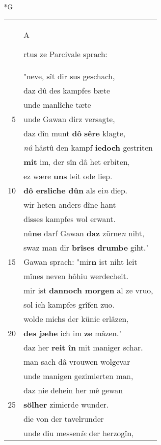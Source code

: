 \documentclass[8pt,a4paper,notitlepage]{article}
\begin{document}
\begin{table}[ht]
\begin{minipage}[t]{0.5\linewidth}
\small
\begin{center}*G
\end{center}
\begin{tabular}{rl}
 & \begin{large}A\end{large}rtus ze Parcivale sprach:\\ 
 & "neve, sît dir sus geschach,\\ 
 & daz dû des kampfes bæte\\ 
 & unde manlîche tæte\\ 
5 & unde Gawan dirz versagte,\\ 
 & daz dîn munt \textbf{dô} \textbf{sêre} klagte,\\ 
 & \textit{nû} hâstû den kampf \textbf{iedoch} gestriten\\ 
 & \textbf{mit} im, der sîn dâ het erbiten,\\ 
 & ez wære \textbf{uns} leit ode liep.\\ 
10 & \textbf{dô ersliche dûn} als ei\textit{n} diep.\\ 
 & wir heten anders dîne hant\\ 
 & disses kampfes wol erwant.\\ 
 & nû\textbf{ne} darf Gawan \textbf{daz} zürne\textit{n} niht,\\ 
 & swaz man dir \textbf{brîses drumbe} giht."\\ 
15 & Gawan sprach: "mir\textbf{n} ist niht leit\\ 
 & mînes neven hôhiu werdecheit.\\ 
 & mir ist \textbf{dannoch morgen} al ze vruo,\\ 
 & sol ich kampfes grîfen zuo.\\ 
 & wolde michs der künic erlâzen,\\ 
20 & \textbf{des jæhe} ich im \textbf{ze} mâzen."\\ 
 & daz her \textbf{reit în} mit maniger schar.\\ 
 & man sach dâ vrouwen wolgevar\\ 
 & unde manigen gezimierten man,\\ 
 & daz nie dehein her mê gewan\\ 
25 & \textbf{sölher} zimierde wunder.\\ 
 & die von der tavelrunder\\ 
 & unde diu messen\textit{îe} der herzogîn,\\ 

\end{tabular}
\end{minipage}
\end{table}
\end{document}
